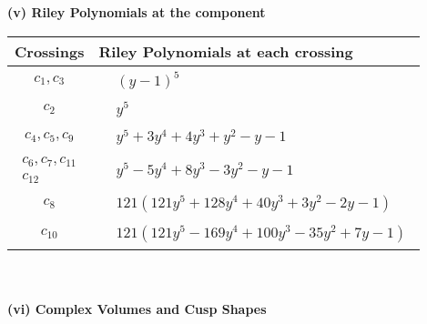 \documentclass[1p]{elsarticle_modified}
\theoremstyle{definition}
\begin{document}
\newpage\renewcommand{\arraystretch}{1}
\flushleft \textbf{(v) Riley Polynomials at the component}\newline \\
\begin{tabular}{m{50pt}|m{274pt}}
Crossings & \hspace{64pt}Riley Polynomials at each crossing \\
\hline $$\begin{aligned}c_{1},c_{3}\end{aligned}$$&$\begin{aligned}
&(y-1)^5
\end{aligned}$\\
\hline $$\begin{aligned}c_{2}\end{aligned}$$&$\begin{aligned}
&y^5
\end{aligned}$\\
\hline $$\begin{aligned}c_{4},c_{5},c_{9}\end{aligned}$$&$\begin{aligned}
&y^5+3 y^4+4 y^3+y^2- y-1
\end{aligned}$\\
\hline $$\begin{aligned}c_{6},c_{7},c_{11}\\c_{12}\end{aligned}$$&$\begin{aligned}
&y^5-5 y^4+8 y^3-3 y^2- y-1
\end{aligned}$\\
\hline $$\begin{aligned}c_{8}\end{aligned}$$&$\begin{aligned}
&121(121 y^5+128 y^4+40 y^3+3 y^2-2 y-1)
\end{aligned}$\\
\hline $$\begin{aligned}c_{10}\end{aligned}$$&$\begin{aligned}
&121(121 y^5-169 y^4+100 y^3-35 y^2+7 y-1)
\end{aligned}$\\
\hline
\end{tabular}\\~\\
\newpage\flushleft \textbf{(vi) Complex Volumes and Cusp Shapes}
\end{document}
